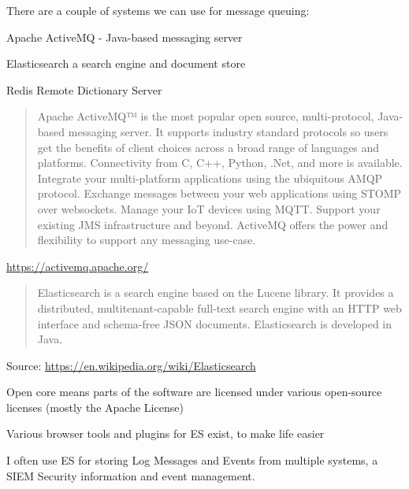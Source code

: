 \documentclass[Screen16to9,17pt]{foils}
\begin{document}

There are a couple of systems we can use for message queuing:
\begin{list2}
\item Apache ActiveMQ -  Java-based messaging server
\item Elasticsearch a search engine and document store
\item Redis Remote Dictionary Server
\end{list2}


\begin{quote}
Apache ActiveMQ™ is the most popular open source, multi-protocol, Java-based messaging server. It supports industry standard protocols so users get the benefits of client choices across a broad range of languages and platforms. Connectivity from C, C++, Python, .Net, and more is available. Integrate your multi-platform applications using the ubiquitous AMQP protocol. Exchange messages between your web applications using STOMP over websockets. Manage your IoT devices using MQTT. Support your existing JMS infrastructure and beyond. ActiveMQ offers the power and flexibility to support any messaging use-case.
\end{quote}

\url{https://activemq.apache.org/}



\begin{quote}
Elasticsearch is a search engine based on the Lucene library. It provides a distributed, multitenant-capable full-text search engine with an HTTP web interface and schema-free JSON documents. Elasticsearch is developed in Java.
\end{quote}

Source: \url{https://en.wikipedia.org/wiki/Elasticsearch}

\begin{list2}
\item Open core means parts of the software are licensed under various open-source licenses (mostly the Apache License)
\item Various browser tools and plugins for ES exist, to make life easier
\item I often use ES for storing Log Messages and Events from multiple systems, a SIEM Security information and event management. 
\end{list2}

\end{document}
